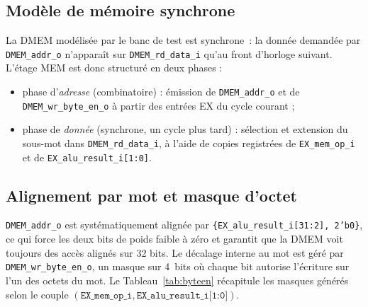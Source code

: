 \documentclass[11pt,a4paper,oneside]{report}
\begin{document}
\subsection{Modèle de mémoire synchrone}
La DMEM modélisée par le banc de test est synchrone~: la donnée
demandée par \texttt{DMEM\_addr\_o} n'apparaît sur
\texttt{DMEM\_rd\_data\_i} qu'au front d'horloge suivant. L'étage
MEM est donc structuré en deux phases :
\begin{itemize}
  \item phase d'\emph{adresse} (combinatoire) : émission de
        \texttt{DMEM\_addr\_o} et de \texttt{DMEM\_wr\_byte\_en\_o}
        à partir des entrées EX du cycle courant ;
  \item phase de \emph{donnée} (synchrone, un cycle plus tard) :
        sélection et extension du sous-mot dans
        \texttt{DMEM\_rd\_data\_i}, à l'aide de copies registrées
        de \texttt{EX\_mem\_op\_i} et de
        \texttt{EX\_alu\_result\_i[1:0]}.
\end{itemize}

\subsection{Alignement par mot et masque d'octet}
\texttt{DMEM\_addr\_o} est systématiquement alignée par
\texttt{\{EX\_alu\_result\_i[31:2], 2'b0\}}, ce qui force les deux
bits de poids faible à zéro et garantit que la DMEM voit toujours
des accès alignés sur 32 bits. Le décalage interne au mot est géré
par \texttt{DMEM\_wr\_byte\_en\_o}, un masque sur 4~bits où
chaque bit autorise l'écriture sur l'un des octets du mot. Le
Tableau~\ref{tab:byteen} récapitule les masques générés selon le couple
$(\texttt{EX\_mem\_op\_i}, \texttt{EX\_alu\_result\_i[1:0]})$.
\end{document}
